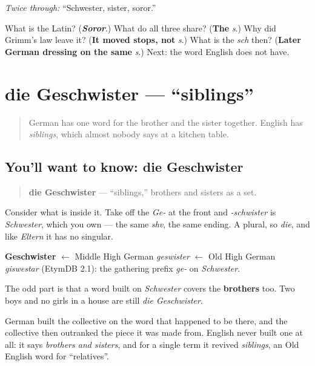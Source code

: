 \emph{Twice through:} \textquotedblleft{}Schwester, sister, soror.\textquotedblright{}

\begin{tcolorbox}[breakable,colback=teal!4,colframe=teal!35!black,title={Before you move on}]
What is the Latin? (\emph{\textbf{Soror}}.) What do all three share? (\textbf{The} \emph{s}.) Why did Grimm's law leave it? (\textbf{It moved stops, not} \emph{s}.) What is the \emph{sch} then? (\textbf{Later German dressing on the same} \emph{s}.) Next: the word English does not have.
\end{tcolorbox}
\section[die Geschwister]{die Geschwister — \textquotedblleft{}siblings\textquotedblright{}}

\label{lesson:GE-C10-geschwister-wort}



\begin{quote}
German has one word for the brother and the sister together. English has \emph{siblings}, which almost nobody says at a kitchen table.
\end{quote}

\subsection*{You'll want to know: die Geschwister}
\begin{quote}
\textbf{die Geschwister} — \textquotedblleft{}siblings,\textquotedblright{} brothers and sisters as a set.
\end{quote}

Consider what is inside it. Take off the \emph{Ge-} at the front and \emph{-schwister} is \emph{Schwester}, which you own — the same \emph{shv}, the same ending. A plural, so \emph{die}, and like \emph{Eltern} it has no singular.

\begin{cousinweb}
\textbf{Geschwister} $\leftarrow$ Middle High German \emph{geswister} $\leftarrow$ Old High German \emph{giswestar} (EtymDB 2.1): the gathering prefix \emph{ge-} on \emph{Schwester}.
\end{cousinweb}

\begin{culture}
The odd part is that a word built on \emph{Schwester} covers the \textbf{brothers} too. Two boys and no girls in a house are still \emph{die Geschwister}.

German built the collective on the word that happened to be there, and the collective then outranked the piece it was made from. English never built one at all: it says \emph{brothers and sisters}, and for a single term it revived \emph{siblings}, an Old English word for \textquotedblleft{}relatives\textquotedblright{}.
\end{culture}

